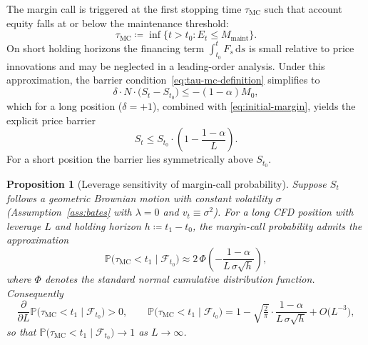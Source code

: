 \documentclass[preprint,12pt,authoryear]{elsarticle}
\newcommand{\PP}{\mathbb{P}}
\newcommand{\FF}{\mathcal{F}}
\newcommand{\dd}{\mathrm{d}}
\newtheorem{proposition}{Proposition}[section]
\theoremstyle{definition}
\begin{document}
The margin call is triggered at the first stopping time $\tau_{\text{MC}}$
such that account equity falls at or below the maintenance threshold:
\begin{equation}
    \tau_{\text{MC}}
    \coloneqq \inf \bigl\{
      t > t_0 : E_t \leq M_{\text{maint}}
    \bigr\}.
    \label{eq:tau-mc-definition}
\end{equation}
On short holding horizons the financing term
$\int_{t_0}^{t} F_s \, \dd s$ is small relative to price innovations
and may be neglected in a leading-order analysis. Under this
approximation, the barrier condition~\eqref{eq:tau-mc-definition}
simplifies to
\begin{equation}
    \delta \cdot N \cdot \bigl( S_t - S_{t_0} \bigr)
    \leq -(1 - \alpha) M_0,
    \label{eq:mc-price-barrier}
\end{equation}
which for a long position ($\delta = +1$), combined with
\eqref{eq:initial-margin}, yields the explicit price barrier
\begin{equation}
    S_t \leq S_{t_0} \cdot \left( 1 - \frac{1 - \alpha}{L} \right).
    \label{eq:mc-explicit-barrier}
\end{equation}
For a short position the barrier lies symmetrically above $S_{t_0}$.

\begin{proposition}[Leverage sensitivity of margin-call probability]
\label{prop:leverage-sensitivity}
Suppose $S_t$ follows a geometric Brownian motion with constant
volatility $\sigma$ (Assumption~\ref{ass:bates} with $\lambda = 0$
and $v_t \equiv \sigma^{2}$). For a long CFD position with leverage
$L$ and holding horizon $h \coloneqq t_1 - t_0$, the margin-call
probability admits the approximation
\begin{equation}
    \PP\bigl( \tau_{\text{MC}} < t_1 \mid \FF_{t_0} \bigr)
    \approx 2 \, \Phi\!\left(
      -\frac{1 - \alpha}{L \, \sigma \sqrt{h}}
    \right),
    \label{eq:mc-probability}
\end{equation}
where $\Phi$ denotes the standard normal cumulative distribution
function. Consequently
\begin{equation}
    \frac{\partial}{\partial L}
    \PP\bigl( \tau_{\text{MC}} < t_1 \mid \FF_{t_0} \bigr) > 0,
    \qquad
    \PP\bigl( \tau_{\text{MC}} < t_1 \mid \FF_{t_0} \bigr)
    = 1 - \sqrt{\tfrac{2}{\pi}} \cdot
        \frac{1 - \alpha}{L \, \sigma \sqrt{h}}
      + O\!\bigl( L^{-3} \bigr),
    \label{eq:mc-leverage-scaling}
\end{equation}
so that
$\PP\bigl( \tau_{\text{MC}} < t_1 \mid \FF_{t_0} \bigr) \to 1$
as $L \to \infty$.
\end{proposition}
\end{document}
